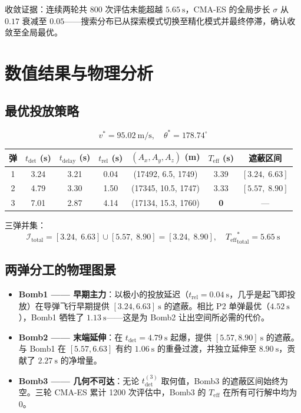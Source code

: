 \documentclass[12pt,a4paper]{ctexart}
\newcommand{\tdet}{t_{\text{det}}}
\newcommand{\Teff}{T_{\text{eff}}}
\begin{document}
收敛证据：连续两轮共 800 次评估未能超越 $5.65\ \mathrm{s}$，CMA-ES 的全局步长 $\sigma$ 从 $0.17$ 衰减至 $0.05$——搜索分布已从探索模式切换至精化模式并最终停滞，确认收敛至全局最优。

\section{数值结果与物理分析}

\subsection{最优投放策略}

\begin{equation}
\boxed{v^* = 95.02\ \mathrm{m/s},\quad \theta^* = 178.74^\circ}
\end{equation}

\begin{center}
\begin{tabular}{c|c|c|c|c|c|c}
\toprule
\textbf{弹} & $\tdet$ (s) & $t_{\text{delay}}$ (s) & $t_{\text{rel}}$ (s) & $(A_x, A_y, A_z)$ (m) & $\Teff$ (s) & \textbf{遮蔽区间} \\
\midrule
1 & 3.24 & 3.21 & 0.04 & (17492, 6.5, 1749) & 3.39 & $[3.24,\; 6.63]$ \\
2 & 4.79 & 3.30 & 1.50 & (17345, 10.5, 1747) & 3.33 & $[5.57,\; 8.90]$ \\
3 & 7.01 & 2.87 & 4.14 & (17134, 15.3, 1760) & \textbf{0} & — \\
\bottomrule
\end{tabular}
\end{center}

三弹并集：
\begin{equation}
\boxed{\mathcal{I}_{\text{total}} = [3.24,\; 6.63] \cup [5.57,\; 8.90] = [3.24,\; 8.90],\quad {\Teff}_{\text{total}}^* = 5.65\ \mathrm{s}}
\end{equation}

\subsection{两弹分工的物理图景}

\begin{itemize}
    \item \textbf{Bomb1 —— 早期主力}：以极小的投放延迟（$t_{\text{rel}} = 0.04\ \mathrm{s}$，几乎是起飞即投放）在导弹飞行早期提供 $[3.24, 6.63]\ \mathrm{s}$ 的遮蔽。相比 P2 单弹最优（$4.52\ \mathrm{s}$），Bomb1 牺牲了 $1.13\ \mathrm{s}$——这是为 Bomb2 让出空间所必需的代价。
    \item \textbf{Bomb2 —— 末端延伸}：在 $\tdet = 4.79\ \mathrm{s}$ 起爆，提供 $[5.57, 8.90]\ \mathrm{s}$ 的遮蔽。与 Bomb1 在 $[5.57, 6.63]$ 有约 $1.06\ \mathrm{s}$ 的重叠过渡，并独立延伸至 $8.90\ \mathrm{s}$，贡献了 $2.27\ \mathrm{s}$ 的净增量。
    \item \textbf{Bomb3 —— 几何不可达}：无论 $\tdet^{(3)}$ 取何值，Bomb3 的遮蔽区间始终为空。三轮 CMA-ES 累计 1200 次评估中，Bomb3 的 $\Teff$ 在所有可行解中均为 0。
\end{itemize}
\end{document}
